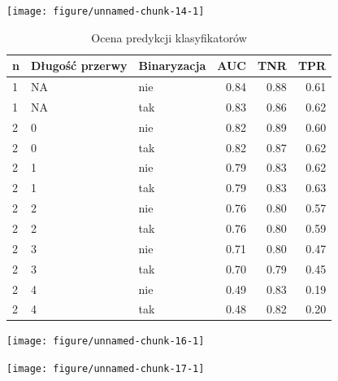 \documentclass[10pt]{beamer}\usepackage[]{graphicx}\usepackage[]{color}
\begin{document}
\begin{frame}

\texttt{[image: figure/unnamed-chunk-14-1]} 


\end{frame}


\begin{frame}
\begin{table}[ht]
\centering
\begin{tabular}{lllrrr}
  \hline
n & Długość przerwy & Binaryzacja & AUC & TNR & TPR \\ 
  \hline
1 & NA & nie & 0.84 & 0.88 & 0.61 \\ 
  1 & NA & tak & 0.83 & 0.86 & 0.62 \\ 
  2 & 0 & nie & 0.82 & 0.89 & 0.60 \\ 
  2 & 0 & tak & 0.82 & 0.87 & 0.62 \\ 
  2 & 1 & nie & 0.79 & 0.83 & 0.62 \\ 
  2 & 1 & tak & 0.79 & 0.83 & 0.63 \\ 
  2 & 2 & nie & 0.76 & 0.80 & 0.57 \\ 
  2 & 2 & tak & 0.76 & 0.80 & 0.59 \\ 
  2 & 3 & nie & 0.71 & 0.80 & 0.47 \\ 
  2 & 3 & tak & 0.70 & 0.79 & 0.45 \\ 
  2 & 4 & nie & 0.49 & 0.83 & 0.19 \\ 
  2 & 4 & tak & 0.48 & 0.82 & 0.20 \\ 
   \hline
\end{tabular}
\caption{Ocena predykcji klasyfikatorów} 
\end{table}


\end{frame}



\begin{frame}

\texttt{[image: figure/unnamed-chunk-16-1]} 


\end{frame}


\begin{frame}


\texttt{[image: figure/unnamed-chunk-17-1]} 


\end{frame}


\begin{frame}

\tiny{
      
      
    }


\end{frame}
\end{document}
